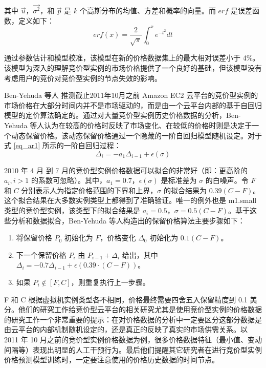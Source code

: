 其中 $\vec u$，$\vec{\sigma^2}$，和 $\vec p$ 是 $k$ 个高斯分布的均值、方差和概率的向量。而 $erf$ 是误差函数，定义如下：
\begin{equation}\label{eq_erf}\nonumber 
erf(x) = \frac{2}{\sqrt{\pi}}\int_{0}^{x} e^{-t^2}dt
\end{equation}

通过参数估计和模型校准，该模型在新的价格数据集上的最大相对误差小于 4\%。该模型为深入的理解竞价型实例的市场价格提供了一个良好的基础，但该模型没有考虑用户的竞价对竞价型实例的节点失效的影响。

Ben-Yehuda 等人 \cite{AgmonBen-Yehuda:2013:DAE:2509413.2509416} 推测截止2011年10月之前 Amazon EC2 云平台的竞价型实例的市场价格在大部分时间内并不是市场驱动的，而是由一个云平台内部的基于自回归模型的定价算法确定的。通过对大量竞价型实例历史价格数据的分析，Ben-Yehuda 等人认为在较高的价格时反映了市场变化、在较低的价格时则是决定于一个动态保留价格。该动态保留价格通过一个隐藏的一阶自回归模型随机设定。对于式 \eqref{eq_ar1} 所示的一阶自回归过程：
\begin{equation}\label{eq_ar1} 
\Delta_i = - a_1\Delta_{i-1}+\epsilon(\sigma)
\end{equation}

2010 年 4 月 到 7 月的竞价型实例价格数据可以拟合的非常好（即：更高阶的 $a_i, i > 1$ 的系数可忽略）。其中，$a_1 = 0.7$，$\epsilon(\sigma)$ 是标准差为 $\sigma$ 的白噪声。令 $F$ 和 $C$ 分别表示人为指定价格范围的下界和上界，$\sigma$ 的拟合结果为 $0.39 (C - F)$。这个拟合结果在大多数实例类型上都得到了准确验证。唯一的例外也是 m1.small 类型的竞价型实例，该类型下的拟合结果是 $a_i = 0.5$，$\sigma = 0.5 (C - F)$。基于这些分析和数据拟合，Ben-Yehuda 等人构造出的保留价格算法主要步骤如下：
\begin{enumerate}
\item 将保留价格 $P_0$ 初始化为 $F$，价格变化 $\Delta_0$ 初始化为 $0.1 (C - F)$。
\item 下一个保留价格 $P_i$ 由 $P_{i-1} + \Delta_i$ 给出，其中 $\Delta_i = - 0.7 \Delta_{i-1}+\epsilon(0.39 \cdot (C - F))$。
\item 如果 $P_i \notin [F, C]$，则重复执行上一步骤。
\end{enumerate}

F 和 C 根据虚拟机实例类型各不相同，价格最终需要四舍五入保留精度到 0.1 美分。他们的研究工作给竞价型云平台的相关研究尤其是使用竞价型实例的价格数据的研究工作一个非常重要的提示：在对价格数据的分析中一定要区分这部分数据是由云平台的内部机制随机设定的，还是真正的反映了真实的市场供需关系。以 2011 年 10 月之前的竞价型实例价格数据为例，很多价格数据特征（最小值、变动间隔等）表现出明显的人工干预行为。最后他们提醒其它研究者在进行竞价型实例价格预测模型训练时，一定要注意使用的价格历史数据的时间节点。

